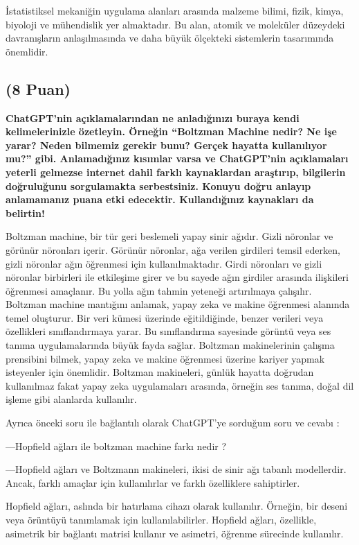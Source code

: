 \documentclass[11pt]{article}
\begin{document}
İstatistiksel mekaniğin uygulama alanları arasında malzeme bilimi, fizik, kimya, biyoloji ve mühendislik yer almaktadır. Bu alan, atomik ve moleküler düzeydeki davranışların anlaşılmasında ve daha büyük ölçekteki sistemlerin tasarımında önemlidir.

\newpage
\subsection{(8 Puan)} \textbf{ChatGPT’nin açıklamalarından ne anladığınızı buraya kendi kelimelerinizle özetleyin. Örneğin ``Boltzman Machine nedir? Ne işe yarar? Neden bilmemiz gerekir bunu? Gerçek hayatta kullanılıyor mu?'' gibi. Anlamadığınız kısımlar varsa ve ChatGPT’nin açıklamaları yeterli gelmezse internet dahil farklı kaynaklardan araştırıp, bilgilerin doğruluğunu sorgulamakta serbestsiniz. Konuyu doğru anlayıp anlamamanız puana etki edecektir. Kullandığınız kaynakları da belirtin!}

    Boltzman machine, bir tür geri beslemeli yapay sinir ağıdır. Gizli nöronlar ve görünür nöronları içerir. Görünür nöronlar, ağa verilen girdileri temsil ederken, gizli nöronlar ağın öğrenmesi için kullanılmaktadır. Girdi nöronları ve gizli nöronlar birbirleri ile etkileşime girer ve bu sayede ağın girdiler arasında ilişkileri öğrenmesi amaçlanır. Bu yolla ağın tahmin yeteneği artırılmaya çalışılır.
        Boltzman machine mantığını anlamak, yapay zeka ve makine öğrenmesi alanında temel oluşturur. Bir veri kümesi üzerinde eğitildiğinde, benzer verileri veya özellikleri sınıflandırmaya yarar. Bu sınıflandırma sayesinde görüntü veya ses tanıma uygulamalarında büyük fayda sağlar. Boltzman makinelerinin çalışma prensibini bilmek, yapay zeka ve makine öğrenmesi üzerine kariyer yapmak isteyenler için önemlidir.
        Boltzman makineleri, günlük hayatta doğrudan kullanılmaz fakat yapay zeka uygulamaları arasında, örneğin ses tanıma, doğal dil işleme gibi alanlarda kullanılır. 

        Ayrıca önceki soru ile bağlantılı olarak ChatGPT'ye sorduğum soru ve cevabı : 

    ---Hopfield ağları ile boltzman machine farkı nedir ?

    ---Hopfield ağları ve Boltzmann makineleri, ikisi de sinir ağı tabanlı modellerdir. Ancak, farklı amaçlar için kullanılırlar ve farklı özelliklere sahiptirler.

Hopfield ağları, aslında bir hatırlama cihazı olarak kullanılır. Örneğin, bir deseni veya örüntüyü tanımlamak için kullanılabilirler. Hopfield ağları, özellikle, asimetrik bir bağlantı matrisi kullanır ve asimetri, öğrenme sürecinde kullanılır.
\end{document}
